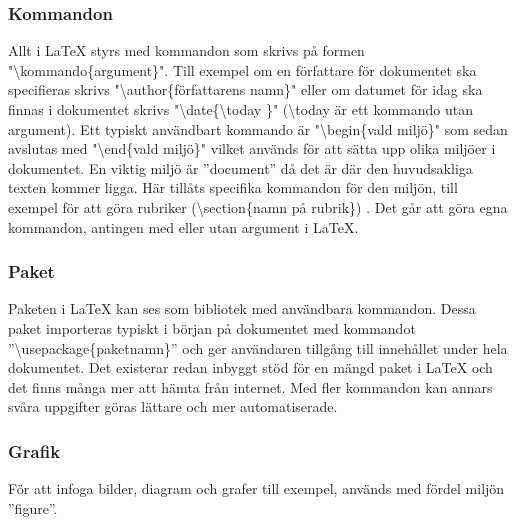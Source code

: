 \subsubsection{Kommandon}
Allt i {\LaTeX} styrs med kommandon som skrivs på formen "\textbackslash kommando\{argument\}". Till exempel om en författare för dokumentet ska specifieras skrivs "\textbackslash author\{författarens namn\}" \hspace{0.2mm} eller om datumet för idag ska finnas i dokumentet skrivs "\textbackslash date\{\textbackslash today \}" \hspace{0.2mm} (\textbackslash today är ett kommando utan argument). Ett typiskt användbart kommando är "\textbackslash begin\{vald miljö\}" \hspace{0.2mm} som sedan avslutas med "\textbackslash end\{vald miljö\}" \hspace{0.2mm} vilket används för att sätta upp olika miljöer i dokumentet. En viktig miljö är ''document''  då det är där den huvudsakliga texten kommer ligga. Här tillåts specifika kommandon för den miljön, till exempel för att göra rubriker (\textbackslash section\{namn på rubrik\}) .
\newline
\newline
Det går att göra egna kommandon, antingen med eller utan argument i {\LaTeX}.   

\subsubsection{Paket}
Paketen i {\LaTeX} kan ses som bibliotek med användbara kommandon. Dessa paket importeras typiskt i början på dokumentet med kommandot ''\textbackslash usepackage\{paketnamn\}'' och ger användaren tillgång till innehållet under hela dokumentet. Det existerar redan inbyggt stöd för en mängd paket i {\LaTeX} och det finns många mer att hämta från internet. Med fler kommandon kan annars svåra uppgifter göras lättare och mer automatiserade.  

\subsubsection{Grafik}
För att infoga bilder, diagram och grafer till exempel, används med fördel miljön ''figure''.

